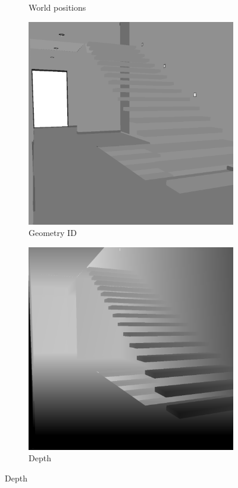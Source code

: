 \begin{figure}
\begin{subfigure}[t]{0.24\linewidth}
		\caption{World positions}
		\label{worldpos_scenepass1}
	\end{subfigure}
	\begin{subfigure}[t]{0.24\linewidth}
		\includegraphics[width=\textwidth]{chapters/chapter_thetool/worldposa_scenepass1}
		\caption{Geometry ID}
		\label{worldposa_scenepass1}
	\end{subfigure}
	\begin{subfigure}[t]{0.24\linewidth}
		\includegraphics[width=\textwidth]{chapters/chapter_thetool/depth_scenepass1}
		\caption{Depth}
		\label{depth_scenepass1}
	\end{subfigure}


\end{figure}
